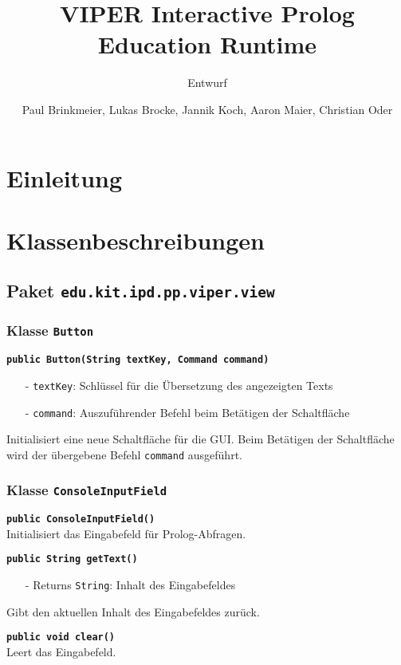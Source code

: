 \documentclass[parskip=full,11pt,twoside]{scrartcl}
\title{VIPER Interactive Prolog Education Runtime}
\subtitle{Entwurf}
\author{Paul Brinkmeier, Lukas Brocke, Jannik Koch, Aaron Maier, Christian Oder}
\begin{document}
\maketitle

\section{Einleitung}

\section{Klassenbeschreibungen}

\subsection{Paket \texttt{edu.kit.ipd.pp.viper.view}}

\subsubsection{Klasse \texttt{Button}}

\textbf{\texttt{public Button(String textKey, Command command)}}
\begin{itemize}[noitemsep]
	\item[-] \texttt{textKey}: Schlüssel für die Übersetzung des angezeigten Texts
	\item[-] \texttt{command}: Auszuführender Befehl beim Betätigen der Schaltfläche
\end{itemize}
Initialisiert eine neue Schaltfläche für die GUI. Beim Betätigen der Schaltfläche wird der übergebene Befehl \texttt{command} ausgeführt.

\subsubsection{Klasse \texttt{ConsoleInputField}}

\textbf{\texttt{public ConsoleInputField()}}\\
Initialisiert das Eingabefeld für Prolog-Abfragen.

\textbf{\texttt{public String getText()}}
\begin{itemize}[noitemsep]
	\item[-] Returns \texttt{String}: Inhalt des Eingabefeldes
\end{itemize}
Gibt den aktuellen Inhalt des Eingabefeldes zurück.

\textbf{\texttt{public void clear()}}\\
Leert das Eingabefeld.
\end{document}
